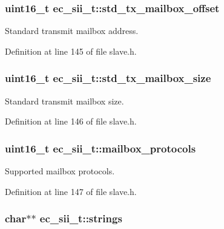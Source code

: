 \subsubsection[{std\-\_\-tx\-\_\-mailbox\-\_\-offset}]{\setlength{\rightskip}{0pt plus 5cm}uint16\-\_\-t {\bf ec\-\_\-sii\-\_\-t\-::std\-\_\-tx\-\_\-mailbox\-\_\-offset}}\label{structec__sii__t_aa5c8f21c36995d272bc456266e035815}


\-Standard transmit mailbox address. 



\-Definition at line 145 of file slave.\-h.

\subsubsection[{std\-\_\-tx\-\_\-mailbox\-\_\-size}]{\setlength{\rightskip}{0pt plus 5cm}uint16\-\_\-t {\bf ec\-\_\-sii\-\_\-t\-::std\-\_\-tx\-\_\-mailbox\-\_\-size}}\label{structec__sii__t_a47eb676cee305c53f5fec378bc95c68d}


\-Standard transmit mailbox size. 



\-Definition at line 146 of file slave.\-h.

\subsubsection[{mailbox\-\_\-protocols}]{\setlength{\rightskip}{0pt plus 5cm}uint16\-\_\-t {\bf ec\-\_\-sii\-\_\-t\-::mailbox\-\_\-protocols}}\label{structec__sii__t_a7740732efd267741b956b8912502d8a1}


\-Supported mailbox protocols. 



\-Definition at line 147 of file slave.\-h.

\subsubsection[{strings}]{\setlength{\rightskip}{0pt plus 5cm}char$\ast$$\ast$ {\bf ec\-\_\-sii\-\_\-t\-::strings}}\label{structec__sii__t_a74ade311e8937d005c486a1a68cd8744}


